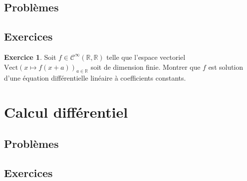 \documentclass[french]{book}
\newcommand{\R}{\mathbb{R}}
\theoremstyle{definition}
\newtheorem{ex}{Exercice}[chapter]
\theoremstyle{remark}
\begin{document}
\section{Problèmes}

\section{Exercices}

\begin{ex}
	Soit $f\in\mathcal{C}^\infty(\R,\R)$ telle que l'espace vectoriel $\text{Vect}(x\mapsto f(x+a))_{a\in\R}$ soit de dimension finie. Montrer que $f$ est solution d'une équation différentielle linéaire à coefficients constants.
\end{ex}

\chapter{Calcul différentiel}

\section{Problèmes}

\section{Exercices}
\end{document}

